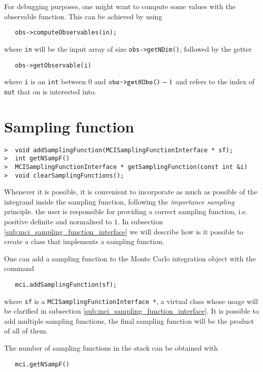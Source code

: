 \documentclass[11pt,a4paper,twoside]{article}
\begin{document}
For debugging purposes, one might want to compute some values with the observable function.
This can be achieved by using
\begin{verbatim}
   obs->computeObservables(in);
\end{verbatim}
where \verb+in+ will be the input array of size \verb+obs->getNDim()+, followed by the getter
\begin{verbatim}
   obs->getObservable(i)
\end{verbatim}
where \verb+i+ is an \verb+int+ between $0$ and $\verb+obs->getNObs()+ - 1$ and refers to the index of \verb+out+ that on is interested into.




\section{Sampling function} %
\label{sec:sampling_function}

\begin{verbatim}
>  void addSamplingFunction(MCISamplingFunctionInterface * sf);
>  int getNSampF()
>  MCISamplingFunctionInterface * getSamplingFunction(const int &i)
>  void clearSamplingFunctions();
\end{verbatim}

Whenever it is possible, it is convenient to incorporate as much as possible of the integrand inside the sampling function, following the \emph{importance sampling} principle.
the user is responsible for providing a correct sampling function, i.e. positive definite and normalised to $1$.
In subsection \ref{sub:mci_sampling_function_interface} we will describe how is it possible to create a class that implements a sampling function.

One can add a sampling function to the Monte Carlo integration object with the command
\begin{verbatim}
   mci.addSamplingFunction(sf);
\end{verbatim}
where \verb+sf+ is a \verb+MCISamplingFunctionInterface *+, a virtual class whose usage will be clarified in subsection \ref{sub:mci_sampling_function_interface}.
It is possible to add multiple sampling functions, the final sampling function will be the product of all of them.

The number of sampling functions in the stack can be obtained with
\begin{verbatim}
   mci.getNSampF()
\end{verbatim}
\end{document}
